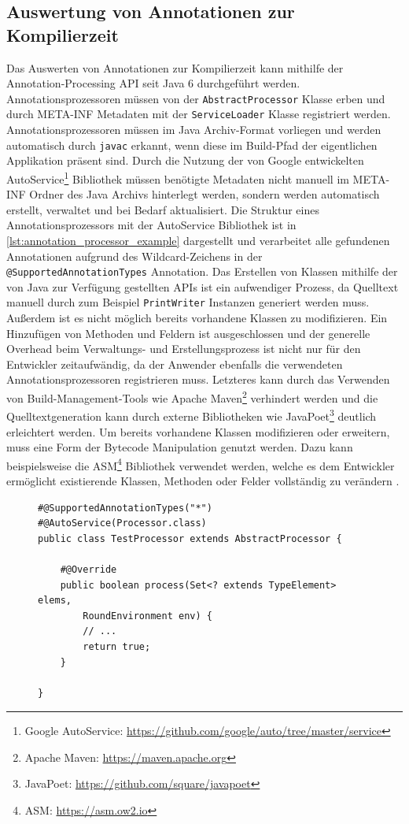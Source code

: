 \subsection{Auswertung von Annotationen zur Kompilierzeit}
Das Auswerten von Annotationen zur Kompilierzeit kann mithilfe der Annotation-Processing API seit Java 6 durchgeführt werden. Annotationsprozessoren müssen von der \texttt{AbstractProcessor} Klasse erben und durch META-INF Metadaten mit der \texttt{ServiceLoader} Klasse registriert werden. Annotationsprozessoren müssen im Java Archiv-Format vorliegen und werden automatisch durch \texttt{javac} erkannt, wenn diese im Build-Pfad der eigentlichen Applikation präsent sind. Durch die Nutzung der von Google entwickelten AutoService\footnote{Google AutoService: \url{https://github.com/google/auto/tree/master/service}} Bibliothek müssen benötigte Metadaten nicht manuell im META-INF Ordner des Java Archivs hinterlegt werden, sondern werden automatisch erstellt, verwaltet und bei Bedarf aktualisiert. Die Struktur eines Annotationsprozessors mit der AutoService Bibliothek ist in \autoref{lst:annotation_processor_example} dargestellt und verarbeitet alle gefundenen Annotationen aufgrund des Wildcard-Zeichens in der \texttt{@SupportedAnnotationTypes} Annotation. Das Erstellen von Klassen mithilfe der von Java zur Verfügung gestellten APIs ist ein aufwendiger Prozess, da Quelltext manuell durch zum Beispiel \texttt{PrintWriter} Instanzen generiert werden muss. Außerdem ist es nicht möglich bereits vorhandene Klassen zu modifizieren. Ein Hinzufügen von Methoden und Feldern ist ausgeschlossen und der generelle Overhead beim Verwaltungs- und Erstellungsprozess ist nicht nur für den Entwickler zeitaufwändig, da der Anwender ebenfalls die verwendeten Annotationsprozessoren registrieren muss. Letzteres kann durch das Verwenden von Build-Management-Tools wie Apache Maven\footnote{\label{ft:maven}Apache Maven: \url{https://maven.apache.org}} verhindert werden und die Quelltextgeneration kann durch externe Bibliotheken wie JavaPoet\footnote{JavaPoet: \url{https://github.com/square/javapoet}} deutlich erleichtert werden. Um bereits vorhandene Klassen modifizieren oder erweitern, muss eine Form der Bytecode Manipulation genutzt werden. Dazu kann beispielsweise die ASM\footnote{\label{ft:asm}ASM: \url{https://asm.ow2.io}} Bibliothek verwendet werden, welche es dem Entwickler ermöglicht existierende Klassen, Methoden oder Felder vollständig zu verändern \cite{Kuleshov2007}.
\begin{figure}[H]
	\begin{lstlisting}[caption={Beispiel -- Annotationsprozessor}, captionpos=b, label=lst:annotation_processor_example]
#@SupportedAnnotationTypes("*")
#@AutoService(Processor.class)
public class TestProcessor extends AbstractProcessor {
	
	#@Override
	public boolean process(Set<? extends TypeElement> elems,
		RoundEnvironment env) {
		// ...
		return true;
	}
	
}
	\end{lstlisting}
\end{figure}